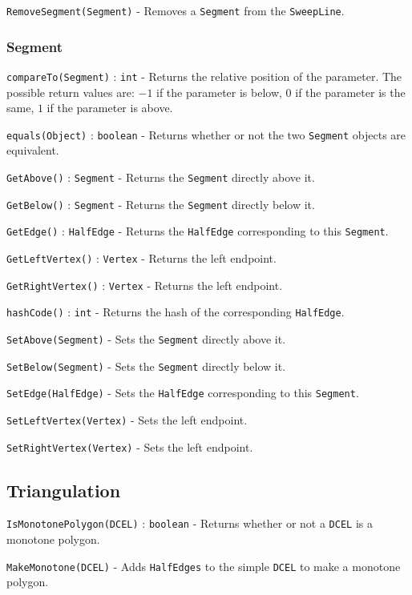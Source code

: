 \documentclass[11pt]{article}
\begin{document}
\texttt{RemoveSegment(Segment)} - Removes a \texttt{Segment} from the \texttt{SweepLine}.

\subsubsection{Segment}
\label{sec:segment}

\texttt{compareTo(Segment)} : \texttt{int} - Returns the relative position of the parameter. The possible return values are: $-1$ if the parameter is below, $0$ if the parameter is the same, $1$ if the parameter is above.

\texttt{equals(Object)} : \texttt{boolean} - Returns whether or not the two \texttt{Segment} objects are equivalent.

\texttt{GetAbove()} : \texttt{Segment} - Returns the \texttt{Segment} directly above it.

\texttt{GetBelow()} : \texttt{Segment} - Returns the \texttt{Segment} directly below it.

\texttt{GetEdge()} : \texttt{HalfEdge} - Returns the \texttt{HalfEdge} corresponding to this \texttt{Segment}.

\texttt{GetLeftVertex()} : \texttt{Vertex} - Returns the left endpoint.

\texttt{GetRightVertex()} : \texttt{Vertex} - Returns the left endpoint.

\texttt{hashCode()} : \texttt{int} - Returns the hash of the corresponding \texttt{HalfEdge}.

\texttt{SetAbove(Segment)} - Sets the \texttt{Segment} directly above it.

\texttt{SetBelow(Segment)} - Sets the \texttt{Segment} directly below it.

\texttt{SetEdge(HalfEdge)} - Sets the \texttt{HalfEdge} corresponding to this \texttt{Segment}.

\texttt{SetLeftVertex(Vertex)} - Sets the left endpoint.

\texttt{SetRightVertex(Vertex)} - Sets the left endpoint.

\subsection{Triangulation}
\label{sec:triangulation}

\texttt{IsMonotonePolygon(DCEL)} : \texttt{boolean} - Returns whether or not a \texttt{DCEL} is a monotone polygon.

\texttt{MakeMonotone(DCEL)} - Adds \texttt{HalfEdges} to the simple \texttt{DCEL} to make a monotone polygon.
\end{document}
